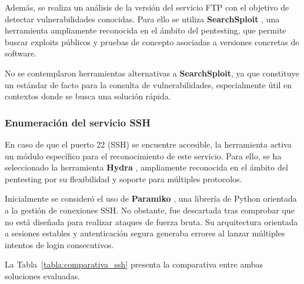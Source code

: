 \begin{parskipenv}
Además, se realiza un análisis de la versión del servicio FTP con el objetivo de detectar vulnerabilidades conocidas. Para ello se utiliza \textbf{SearchSploit} \cite{searchsploit}, una herramienta ampliamente reconocida en el ámbito del pentesting, que permite buscar exploits públicos y pruebas de concepto asociadas a versiones concretas de software. 

No se contemplaron herramientas alternativas a \textbf{SearchSploit}, ya que constituye un estándar de facto para la consulta de vulnerabilidades, especialmente útil en contextos donde se busca una solución rápida.

\subsubsection*{Enumeración del servicio SSH}
En caso de que el puerto 22 (SSH) se encuentre accesible, la herramienta activa un módulo específico para el reconocimiento de este servicio. Para ello, se ha seleccionado la herramienta \textbf{Hydra} \cite{hydra}, ampliamente reconocida en el ámbito del pentesting por su flexibilidad y soporte para múltiples protocolos.

Inicialmente se consideró el uso de \textbf{Paramiko} \cite{paramiko}, una librería de Python orientada a la gestión de conexiones SSH. No obstante, fue descartada tras comprobar que no está diseñada para realizar ataques de fuerza bruta. Su arquitectura orientada a sesiones estables y autenticación segura generaba errores al lanzar múltiples intentos de login consecutivos.

La Tabla~\ref{tabla:comparativa_ssh} presenta la comparativa entre ambas soluciones evaluadas.

\begin{table}[H]
\centering
\renewcommand{\arraystretch}{1.4}
\caption{Comparativa de herramientas para fuerza bruta SSH.}
\label{tabla:comparativa_ssh}
\end{table}


\end{parskipenv}
